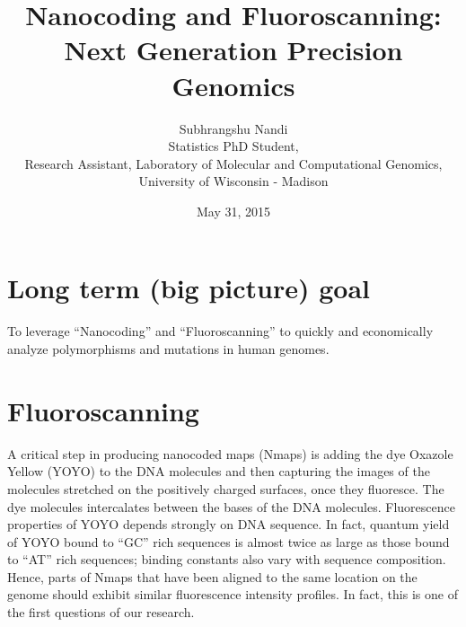 \documentclass[11pt]{extarticle} %
\begin{document}

\title{Nanocoding and Fluoroscanning: Next Generation Precision Genomics}
\author{Subhrangshu Nandi\\
  Statistics PhD Student, \\
  Research Assistant,
  Laboratory of Molecular and Computational Genomics, \\
  University of Wisconsin - Madison}
\date{May 31, 2015}

\maketitle


\section*{Long term (big picture) goal}
To leverage ``Nanocoding'' and ``Fluoroscanning'' to quickly and economically analyze polymorphisms and mutations in human genomes. 

\section*{Fluoroscanning}
A critical step in producing nanocoded maps (Nmaps) is adding the dye Oxazole Yellow (YOYO) to the DNA molecules and then capturing the images of the molecules stretched on the positively charged surfaces, once they fluoresce. The dye molecules intercalates between the bases of the DNA molecules. Fluorescence properties of YOYO depends strongly on DNA sequence. In fact, quantum yield of YOYO bound to “GC” rich sequences is almost twice as large as those bound to “AT” rich sequences; binding constants also vary with sequence composition. Hence, parts of Nmaps that have been aligned to the same location on the genome should exhibit similar fluorescence intensity profiles. In fact, this is one of the first questions of our research. 
\end{document}
